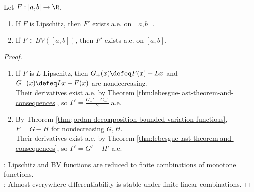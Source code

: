 \begin{corollary} \label{cor:lipschitz-and-bv-differentiability} \\
Let $F:[a,b]\to\R$.
\begin{enumerate}[label=(\roman*)]
\setlength{\itemsep}{0pt}
\item If $F$ is Lipschitz, then $F'$ exists a.e. on $[a,b]$.
\item If $F\in BV([a,b])$, then $F'$ exists a.e. on $[a,b]$.
\end{enumerate}
\begin{proof}
\begin{enumerate}[label=(\roman*)]
\setlength{\itemsep}{0pt}
\item If $F$ is $L$-Lipschitz, then $G_+(x)\defeq F(x)+Lx$ and $G_-(x)\defeq Lx-F(x)$ are nondecreasing.\\
Their derivatives exist a.e. by Theorem \ref{thm:lebesgue-last-theorem-and-consequences}, so $F'=\frac{G_+'-G_-'}{2}$ a.e.
\item By Theorem \ref{thm:jordan-decomposition-bounded-variation-functions}, $F=G-H$ for nondecreasing $G,H$.\\
Their derivatives exist a.e. by Theorem \ref{thm:lebesgue-last-theorem-and-consequences}, so $F'=G'-H'$ a.e.
\end{enumerate}
: Lipschitz and BV functions are reduced to finite combinations of monotone functions.\\
: Almost-everywhere differentiability is stable under finite linear combinations.
\end{proof}
\end{corollary}


